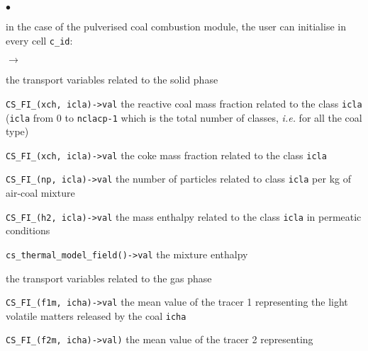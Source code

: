 \begin{list}{$\bullet$}{}
        \item in the case of the pulverised coal combustion module, the
             user can initialise in every cell \texttt{c\_id}:
              \begin{list}{$\rightarrow$}{}
                     \item the transport variables related to the solid phase
                           \begin{list}{}{}
                                  \item \texttt{CS\_FI\_(xch, icla)->val}
                                  the reactive coal mass fraction related to the
                                  class \texttt{icla} (\texttt{icla} from 0 to
                                  \texttt{nclacp-1} which is the total number of
                                  classes, {\em i.e.} for all the coal type)
                                  \item \texttt{CS\_FI\_(xch, icla)->val}
                                  the coke mass fraction related to the class
                                  \texttt{icla}
                                  \item \texttt{CS\_FI\_(np, icla)->val} the
                                  number of particles related to class
                                  \texttt{icla} per kg of air-coal mixture
                                  \item \texttt{CS\_FI\_(h2, icla)->val} the
                                   mass enthalpy related to the class
                                   \texttt{icla} in permeatic conditions
                           \end{list}
                     \item \texttt{cs\_thermal\_model\_field()->val} the mixture enthalpy
                     \item the transport variables related to the gas phase
                           \begin{list}{}{}
                                  \item
                                       \texttt{CS\_FI\_(f1m, icha)->val} the
                                       mean value of the tracer 1 representing
                                       the light volatile matters released by
                                       the coal \texttt{icha}
                                  \item
                                       \texttt{CS\_FI\_(f2m, icha)->val)} the
                                        mean value of the tracer 2 representing

\end{list}
\end{list}
\end{list}

